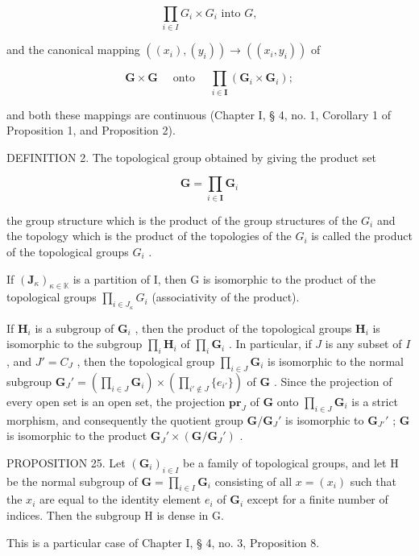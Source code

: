 \[
\prod_ {i \in I} G _ {i} \times G _ {i} \text {   into   } G,
\]

and the canonical mapping \(((x_{i}), (y_{i})) \to ((x_{i}, y_{i}))\) of

\[
\mathbf {G} \times \mathbf {G} \quad \text { onto } \quad \prod_ {i \in \mathbf {I}} (\mathbf {G} _ {i} \times \mathbf {G} _ {i});
\]

and both these mappings are continuous (Chapter I, § 4, no. 1, Corollary 1 of Proposition 1, and Proposition 2).

DEFINITION 2. The topological group obtained by giving the product set

\[
\mathbf {G} = \prod_ {i \in \mathbf {I}} \mathbf {G} _ {i}
\]

the group structure which is the product of the group structures of the \(G_{i}\) and the topology which is the product of the topologies of the \(G_{i}\) is called the product of the topological groups \(G_{i}\) .

If \((\mathbf{J}_{\kappa})_{\kappa \in \mathbb{K}}\) is a partition of I, then G is isomorphic to the product of the topological groups \(\prod_{i \in J_{\kappa}} G_{i}\) (associativity of the product).

If \(\mathbf{H}_{i}\) is a subgroup of \(\mathbf{G}_{i}\) , then the product of the topological groups \(\mathbf{H}_{i}\) is isomorphic to the subgroup \(\prod_{i} \mathbf{H}_{i}\) of \(\prod_{i} \mathbf{G}_{i}\) . In particular, if \(J\) is any subset of \(I\) , and \(J' = C_{J}\) , then the topological group \(\prod_{i \in J} \mathbf{G}_{i}\) is isomorphic to the normal subgroup \(\mathbf{G}_{J}' = (\prod_{i \in J} \mathbf{G}_{i}) \times (\prod_{i' \notin J} \{e_{i'}\})\) of \(\mathbf{G}\) . Since the projection of every open set is an open set, the projection \(\mathbf{pr}_{J}\) of \(\mathbf{G}\) onto \(\prod_{i \in J} \mathbf{G}_{i}\) is a strict morphism, and consequently the quotient group \(\mathbf{G} / \mathbf{G}_{J}'\) is isomorphic to \(\mathbf{G}_{J'}'\) ; \(\mathbf{G}\) is isomorphic to the product \(\mathbf{G}_{J}' \times (\mathbf{G} / \mathbf{G}_{J}')\) .

PROPOSITION 25. Let \((\mathbf{G}_{i})_{i\in I}\) be a family of topological groups, and let H be the normal subgroup of \(\mathbf{G} = \prod_{i\in I}\mathbf{G}_i\) consisting of all \(x = (x_{i})\) such that the \(x_{i}\) are equal to the identity element \(e_i\) of \(\mathbf{G}_i\) except for a finite number of indices. Then the subgroup H is dense in G.

This is a particular case of Chapter I, § 4, no. 3, Proposition 8.

